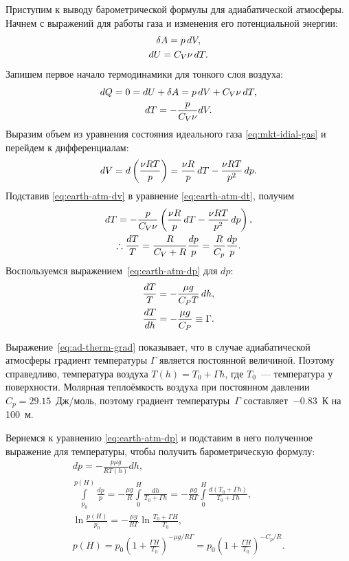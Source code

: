 Приступим к выводу барометрической формулы для адиабатической атмосферы. Начнем с выражений для работы газа и изменения его потенциальной энергии:
\begin{gather*}
	\delta A = p \,d V,\\
	dU = C_V \nu \,d T.
\end{gather*}
Запишем первое начало термодинамики для тонкого слоя воздуха:
\begin{gather}
	dQ = 0 = dU + \delta A = p \,d V + C_V \nu \,d T,\notag\\
	dT = - \frac{p}{C_V \nu} dV.
	\label{eq:earth-atm-dt}
\end{gather}
Выразим объем из уравнения состояния идеального газа \eqref{eq:mkt-idial-gas} и перейдем к дифференциалам:
\begin{equation}
	dV = d \left(\frac{\nu R T}{p} \right) = \frac{\nu R}{p} \,d T - \frac{\nu R T}{p^2} \,d p.
	\label{eq:earth-atm-dv}
\end{equation}
Подставив \eqref{eq:earth-atm-dv} в уравнение \eqref{eq:earth-atm-dt}, получим
\begin{gather*}
	dT = - \frac{p}{C_V \nu} \left( \frac{\nu R}{p} \,d T - \frac{\nu R T}{p^2} \,d p \right),\\
	\therefore \frac{dT}{T} = \frac{R}{C_V + R} \frac{dp}{p} = \frac{R}{C_p} \frac{dp}{p}.
\end{gather*}
Воспользуемся выражением~\eqref{eq:earth-atm-dp} для $dp$:
\begin{gather}
	\frac{d T}{T} = -\frac{\mu g}{C_P T} \,d h,\\
	\frac{dT}{dh} =  -\frac{\mu g}{C_P} \equiv \Gamma.\label{eq:ad-therm-grad}
\end{gather}

Выражение~\eqref{eq:ad-therm-grad} показывает, что в случае адиабатической атмосферы градиент температуры $\Gamma$ является постоянной величиной. Поэтому справедливо, температура воздуха $T(h) = T_0 + \Gamma h$, где $T_0$~--- температура у поверхности. Молярная теплоёмкость воздуха при постоянном давлении $C_p = 29.15$~Дж/моль, поэтому градиент температуры~$\Gamma$ составляет~$-0.83$~К на 100~м. 

Вернемся к уравнению \eqref{eq:earth-atm-dp} и подставим в него полученное выражение для температуры, чтобы получить барометрическую формулу:
\begin{gather*}
	dp = - \frac{p \mu g}{RT(h)} dh,\\
	\int\limits_{p_0}^{p(H)} \frac{dp}{p} = - \frac{\mu g}{R} \int\limits_0^H \frac{dh}{T_0 + \Gamma h}= - \frac{\mu g}{R\Gamma} \int\limits_0^H \frac{d(T_0 + \Gamma h)}{T_0 + \Gamma h},\\
	\ln \frac{p(H)}{p_0} = - \frac{\mu g}{R\Gamma} \ln \frac{T_0 + \Gamma H}{T_0},\\
	p(H) = p_0 \left(1 + \frac{\Gamma H}{T_0} \right)^{ - \mu g /R\Gamma} =  p_0 \left(1 + \frac{\Gamma H}{T_0} \right)^{ - C_p/R}.
\end{gather*}

